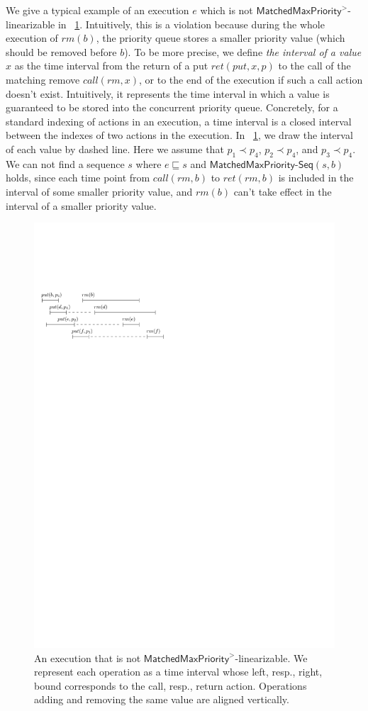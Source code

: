 We give a typical example of an execution $e$ which is not $\mathsf{MatchedMaxPriority}^>$-linearizable in
\figurename~\ref{fig:introduce gap for EPQ1Lar}. Intuitively, this is a violation because during the whole execution of $\textit{rm}(b)$, the priority queue stores a smaller priority value (which should be removed before $b$). To be more precise, we define \emph{the interval of a value $x$} as the time interval from the return of a put $\textit{ret}(\textit{put},x,p)$ to the call of the matching remove $\textit{call}(rm,x)$, or to the end of the execution if such a call action doesn't exist. Intuitively, it represents the time interval in which a value is guaranteed to be stored into the concurrent priority queue. Concretely, for a standard indexing of actions in an execution, a time interval is a closed interval between the indexes of two actions in the execution.
In \figurename~\ref{fig:introduce gap for EPQ1Lar}, we draw the interval of each value by dashed line. Here we assume that $p_1 \prec p_4$, $p_2 \prec p_4$, and $p_3 \prec p_4$. We can not find a sequence $s$ where $e \sqsubseteq s$ and $\mathsf{MatchedMaxPriority}\mathsf{\text{-}Seq}(s,b)$ holds, since each time point from $\textit{call}(\textit{rm},b)$ to $\textit{ret}(\textit{rm},b)$ is included in the interval of some smaller priority value, and $\textit{rm}(b)$ can't take effect in the interval of a smaller priority value.

\begin{figure}[htbp]
  \centering
  \includegraphics[width=0.4 \textwidth]{figures/PIC-HIS-INTRO-GAP-EPQ1L.pdf}
  \caption{An execution that is not $\mathsf{MatchedMaxPriority}^{>}$-linearizable. We represent each operation as a time interval whose left, resp., right, bound corresponds to the call, resp., return action. Operations adding and removing the same value are aligned vertically.}
  \label{fig:introduce gap for EPQ1Lar}
\end{figure}

